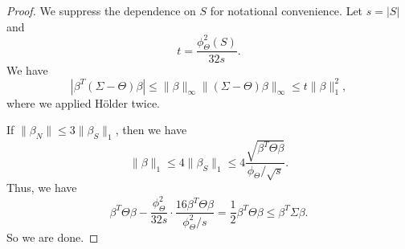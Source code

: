 \documentclass[a4paper]{article}
\begin{document}
\begin{proof}
  We suppress the dependence on $S$ for notational convenience. Let $s = |S|$ and
  \[
    t = \frac{\phi^2_\Theta(S)}{32s}.
  \]
  We have
  \[
    |\beta^T (\Sigma - \Theta) \beta| \leq \|\beta\|_\infty \|(\Sigma - \Theta) \beta\|_\infty \leq t\|\beta\|_1^2,
  \]
  where we applied H\"older twice.

  If $\|\beta_N\| \leq 3 \|\beta_S\|_1$, then we have
  \[
    \|\beta\|_1 \leq 4 \|\beta_S\|_1 \leq 4\frac{\sqrt{\beta^T \Theta \beta}}{\phi_\Theta/\sqrt{s}}.
  \]
  Thus, we have
  \[
    \beta^T \Theta \beta - \frac{\phi^2_\Theta}{32 s} \cdot \frac{16 \beta^T \Theta \beta}{\phi^2_\Theta /s} = \frac{1}{2} \beta^T \Theta \beta \leq \beta^T \Sigma \beta.
  \]
  So we are done.
\end{proof}
\printindex
\end{document}
